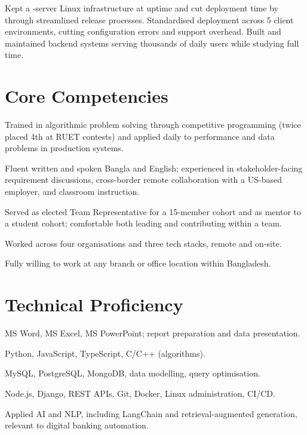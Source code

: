 \documentclass[10pt, a4paper]{article}
\begin{document}
Kept a \factExpCodestudioServers{}-server Linux infrastructure at \factExpCodestudioUptime{} uptime and cut deployment time by \factExpCodestudioDeploy{} through streamlined release processes. Standardised deployment across 5 client environments, cutting configuration errors and support overhead. Built and maintained backend systems serving thousands of daily users while studying full time.

\section{Core Competencies}
\begin{description}[style=unboxed, leftmargin=0pt, itemsep=0.3ex]
    \item[Analytical \& Problem Solving:] Trained in algorithmic problem solving through competitive programming (twice placed 4th at RUET contests) and applied daily to performance and data problems in production systems.
    \item[Communication:] Fluent written and spoken Bangla and English; experienced in stakeholder-facing requirement discussions, cross-border remote collaboration with a US-based employer, and classroom instruction.
    \item[Teamwork \& Leadership:] Served as elected Team Representative for a 15-member cohort and as mentor to a student cohort; comfortable both leading and contributing within a team.
    \item[Adaptability \& Integrity:] Worked across four organisations and three tech stacks, remote and on-site.
    \item[Willingness to Relocate:] Fully willing to work at any branch or office location within Bangladesh.
\end{description}

\section{Technical Proficiency}
\begin{description}[style=unboxed, leftmargin=0pt, itemsep=0.2ex]
    \item[Office \& Productivity:] MS Word, MS Excel, MS PowerPoint; report preparation and data presentation.
    \item[Programming Languages:] Python, JavaScript, TypeScript, C/C++ (algorithms).
    \item[Databases \& Data:] MySQL, PostgreSQL, MongoDB, data modelling, query optimisation.
    \item[Software \& Systems:] Node.js, Django, REST APIs, Git, Docker, Linux administration, CI/CD.
    \item[Emerging Technology:] Applied AI and NLP, including LangChain and retrieval-augmented generation, relevant to digital banking automation.
\end{description}
\end{document}
